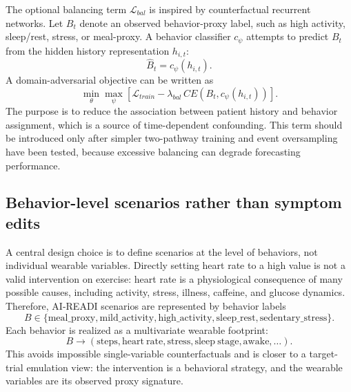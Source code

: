 The optional balancing term $\mathcal{L}_{bal}$ is inspired by counterfactual recurrent networks. Let $B_t$ denote an observed behavior-proxy label, such as high activity, sleep/rest, stress, or meal-proxy. A behavior classifier $c_\psi$ attempts to predict $B_t$ from the hidden history representation $h_{i,t}$:
\begin{equation}
    \hat{B}_t = c_\psi(h_{i,t}).
\end{equation}
A domain-adversarial objective can be written as
\begin{equation}
    \min_\theta \max_\psi
    \left[\mathcal{L}_{train} - \lambda_{bal}\, CE(B_t,c_\psi(h_{i,t}))\right].
    \label{eq:adversarial_balancing}
\end{equation}
The purpose is to reduce the association between patient history and behavior assignment, which is a source of time-dependent confounding. This term should be introduced only after simpler two-pathway training and event oversampling have been tested, because excessive balancing can degrade forecasting performance.

\subsection{Behavior-level scenarios rather than symptom edits}
\label{subsec:behavior_level_scenarios}

A central design choice is to define scenarios at the level of behaviors, not individual wearable variables. Directly setting heart rate to a high value is not a valid intervention on exercise: heart rate is a physiological consequence of many possible causes, including activity, stress, illness, caffeine, and glucose dynamics. Therefore, AI-READI scenarios are represented by behavior labels
\begin{equation}
    B \in \{\mathrm{meal\_proxy},\mathrm{mild\_activity},\mathrm{high\_activity},
    \mathrm{sleep\_rest},\mathrm{sedentary\_stress}\}.
\end{equation}
Each behavior is realized as a multivariate wearable footprint:
\begin{equation}
    B \longrightarrow
    (\mathrm{steps}, \mathrm{heart\ rate}, \mathrm{stress}, \mathrm{sleep\ stage}, \mathrm{awake}, \ldots).
\end{equation}
This avoids impossible single-variable counterfactuals and is closer to a target-trial emulation view: the intervention is a behavioral strategy, and the wearable variables are its observed proxy signature.

